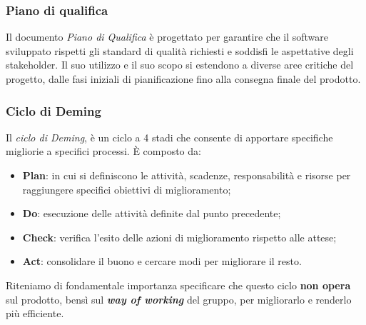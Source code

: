 \subsubsection{Piano di qualifica}
Il documento \textit{Piano di Qualifica} è progettato per garantire che il software sviluppato rispetti gli standard di qualità richiesti e soddisfi le aspettative degli stakeholder. Il suo utilizzo e il suo scopo si estendono a diverse aree critiche del progetto, dalle fasi iniziali di pianificazione fino alla consegna finale del prodotto.

\subsubsection{Ciclo di Deming}
Il \textit{ciclo di Deming}, è un ciclo a 4 stadi che consente di apportare specifiche migliorie a specifici processi. È composto da:
\begin{itemize}
	\item \textbf{Plan}: in cui si definiscono le attività, scadenze, responsabilità e risorse per raggiungere specifici obiettivi di miglioramento;
	\item \textbf{Do}: esecuzione delle attività definite dal punto precedente;
	\item \textbf{Check}: verifica l'esito delle azioni di miglioramento rispetto alle attese;
	\item \textbf{Act}: consolidare il buono e cercare modi per migliorare il resto.
\end{itemize}
Riteniamo di fondamentale importanza specificare che questo ciclo \textbf{non opera} sul prodotto, bensì sul \textbf{\textit{way of working}} del gruppo, per migliorarlo e renderlo più efficiente.

